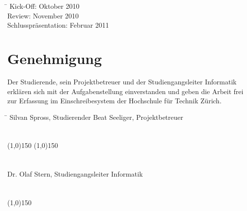 \documentclass[]{scrreprt}
\begin{document}
    \begin{tabbing}
        \hspace*{4cm}\= \kill
    	Kick-Off:               \> Oktober 2010 \\
    	Review:                 \> November 2010 \\
    	Schlusspräsentation:    \> Februar 2011 \\
    \end{tabbing}

    \section{Genehmigung}
    Der Studierende, sein Projektbetreuer und der Studiengangsleiter 
    Informatik erklären sich mit der Aufgabenstellung einverstanden und geben 
    die Arbeit frei zur Erfassung im Einschreibesystem der Hochschule für 
    Technik Zürich.

    \begin{tabbing}
        \hspace*{10cm}\= \kill
    	Silvan Spross, Studierender \> Beat Seeliger, Projektbetreuer \\\\\\
        \line(1,0){150} \> \line(1,0){150} \\\\\\
    	Dr. Olaf Stern, Studiengangsleiter Informatik \\\\\\
        \line(1,0){150}
    \end{tabbing}
    
    \renewcommand{\bibname}{Referenzen}
    
    
    
\end{document}
